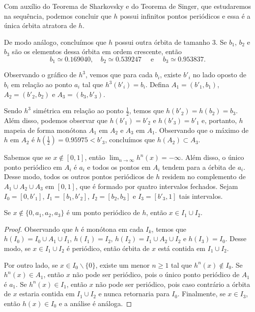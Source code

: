 Com auxílio do Teorema de Sharkovsky e do Teorema de Singer, que estudaremos na sequência, podemos concluir que $h$ possui infinitos pontos periódicos e essa é a única órbita atratora de $h$.

De modo análogo, concluímos que $h$ possui outra órbita de tamanho $3$. Se $b_1$, $b_2$ e $b_3$ são os elementos dessa órbita em ordem crescente, então
$$b_1 \simeq 0.169040, \quad b_2 \simeq 0.539247 \quad  \text{ e } \quad b_3 \simeq 0.953837.$$

Observando o gráfico de $h^3$, vemos que para cada $b_i$, existe $b'_i$ no lado oposto de $b_i$ em relação ao ponto $a_i$ tal que $h^3(b'_i) = b_i$. Defina $A_1 = (b'_1, b_1)$, $A_2 = (b'_2, b_2)$ e $A_3 = (b_3, b'_3)$.

Sendo $h^3$ simétrica em relação ao ponto $\frac{1}{2}$, temos que $h(b'_2) = h(b_2) = b_3$.
Além disso, podemos observar que $h(b'_1) = b'_2$ e $h(b'_3) = b'_1$ e, portanto, $h$ mapeia de forma monótona $A_1$ em $A_2$ e $A_3$ em $A_1$. Observando que o máximo de $h$ em $A_2$ é $h( \frac{1}{2}) = 0.95975 < b'_3$, concluímos que $h(A_2) \subset A_3$.

Sabemos que se $x \notin [0, 1]$, então $\lim_{n \to \infty} h^n(x) = -\infty$.
Além disso, o único ponto periódico em $A_i$ é $a_i$ e todos os pontos em $A_i$ tendem para a órbita de $a_i$.
Desse modo, todos os outros pontos periódicos de $h$ residem no complemento de $A_1 \cup A_2 \cup A_3$ em $[0, 1]$, que é formado por quatro intervalos fechados. Sejam $I_0 = [0, b'_1]$, $I_1 = [b_1, b'_2]$, $I_2 = [b_2, b_3]$ e $I_3 = [b'_3, 1]$ tais intervalos.

\begin{proposition}
Se $x \notin \lbrace 0, a_1, a_2, a_3 \rbrace$ é um ponto periódico de $h$, então $x \in I_1 \cup I_2$.
\end{proposition}

\begin{proof}
Observando que $h$ é monótona em cada $I_k$, temos que $h(I_0) = I_0 \cup A_1 \cup I_1$, $h(I_1) = I_2$, $h(I_2) = I_1 \cup A_2 \cup I_2$ e $h(I_3) = I_0$. Desse modo, se $x \in I_1 \cup I_2$ é periódico, então órbita de $x$ está contida em $I_1 \cup I_2$.

Por outro lado, se $x \in I_0 \backslash \lbrace 0 \rbrace$, existe um menor $n \geq 1$ tal que $h^n(x) \notin I_0$. Se $h^n(x) \in A_1$, então $x$ não pode ser periódico, pois o único ponto periódico de $A_1$ é $a_1$.
Se $h^n(x) \in I_1$, então $x$ não pode ser periódico, pois caso contrário a órbita de $x$ estaria contida em $I_1 \cup I_2$ e nunca retornaria para $I_0$.
Finalmente, se $x \in I_3$, então $h(x) \in I_0$ e a análise é análoga.
\end{proof}


